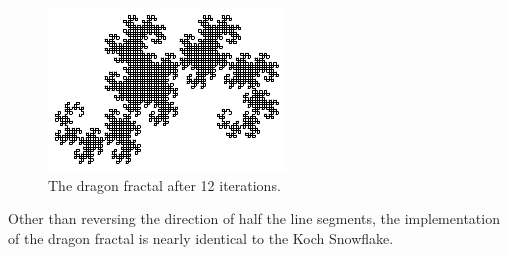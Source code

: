 \begin{figure}[tbp]
  \centering
  \includegraphics[width=\linewidth]{images/Dragon12}
  \caption{The dragon fractal after 12 iterations.}
  \label{fig:Dragon12}
\end{figure}

Other than reversing the direction of half the line segments, the implementation of the dragon fractal is nearly identical to the Koch Snowflake.



\subsection{}



